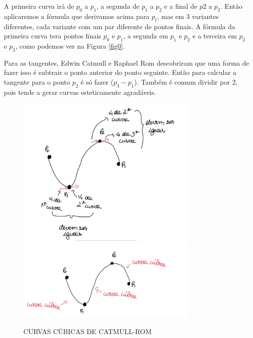 A primeira curva irá de $p_0$ a $p_1$, a segunda de $p_1$ a $p_2$ e a final de $p2$ a $p_3$. Então aplicaremos a fórmula que derivamos acima para $p_t$, mas em 3 variantes diferentes, cada variante com um par diferente de pontos finais. A fórmula da primeira curva tera pontos finais $p_0$ e $p_1$, a segunda em $p_1$ e $p_2$ e a terceira em $p_2$ e $p_3$, como podemos ver na Figura \ref{fig0}. 
 
 Para as tangentes, Edwin Catmull e Raphael Rom descobriram que uma forma de fazer isso é subtrair o ponto anterior do ponto seguinte. Então para calcular a tangente para o ponto $p_2$ é só fazer ($p_3 - p_1$). Também é comum dividir por 2, pois tende a gerar curvas esteticamente agradáveis.

\begin{figure}[h!]
    \caption{CURVAS CÚBICAS DE CATMULL-ROM}
    \centering
    \includegraphics[width=0.8\textwidth]{fig/s1.jpg}
    \vspace{0.5em} %
    \includegraphics[width=0.8\textwidth]{fig/s2.jpg}
    \label{fig:spline_tangentes}
\end{figure}

